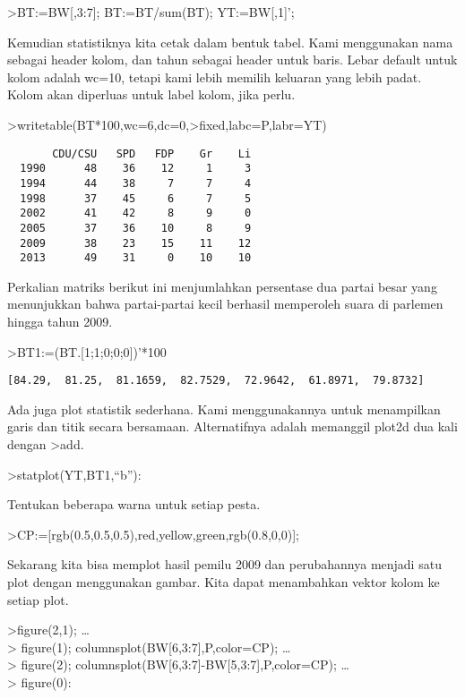 \documentclass[
]{book}
\begin{document}
\textgreater BT:=BW{[},3:7{]}; BT:=BT/sum(BT); YT:=BW{[},1{]}';

Kemudian statistiknya kita cetak dalam bentuk tabel. Kami menggunakan nama sebagai header kolom, dan tahun sebagai header untuk baris. Lebar default untuk kolom adalah wc=10, tetapi kami lebih memilih keluaran yang lebih padat. Kolom akan diperluas untuk label kolom, jika perlu.

\textgreater writetable(BT*100,wc=6,dc=0,\textgreater fixed,labc=P,labr=YT)

\begin{verbatim}
       CDU/CSU   SPD   FDP    Gr    Li
  1990      48    36    12     1     3
  1994      44    38     7     7     4
  1998      37    45     6     7     5
  2002      41    42     8     9     0
  2005      37    36    10     8     9
  2009      38    23    15    11    12
  2013      49    31     0    10    10
\end{verbatim}

Perkalian matriks berikut ini menjumlahkan persentase dua partai besar yang menunjukkan bahwa partai-partai kecil berhasil memperoleh suara di parlemen hingga tahun 2009.

\textgreater BT1:=(BT.{[}1;1;0;0;0{]})'*100

\begin{verbatim}
[84.29,  81.25,  81.1659,  82.7529,  72.9642,  61.8971,  79.8732]
\end{verbatim}

Ada juga plot statistik sederhana. Kami menggunakannya untuk menampilkan garis dan titik secara bersamaan. Alternatifnya adalah memanggil plot2d dua kali dengan \textgreater add.

\textgreater statplot(YT,BT1,``b''):

Tentukan beberapa warna untuk setiap pesta.

\textgreater CP:={[}rgb(0.5,0.5,0.5),red,yellow,green,rgb(0.8,0,0){]};

Sekarang kita bisa memplot hasil pemilu 2009 dan perubahannya menjadi satu plot dengan menggunakan gambar. Kita dapat menambahkan vektor kolom ke setiap plot.

\textgreater figure(2,1); \ldots{}\\
\textgreater{} figure(1); columnsplot(BW{[}6,3:7{]},P,color=CP); \ldots{}\\
\textgreater{} figure(2); columnsplot(BW{[}6,3:7{]}-BW{[}5,3:7{]},P,color=CP); \ldots{}\\
\textgreater{} figure(0):
\end{document}
